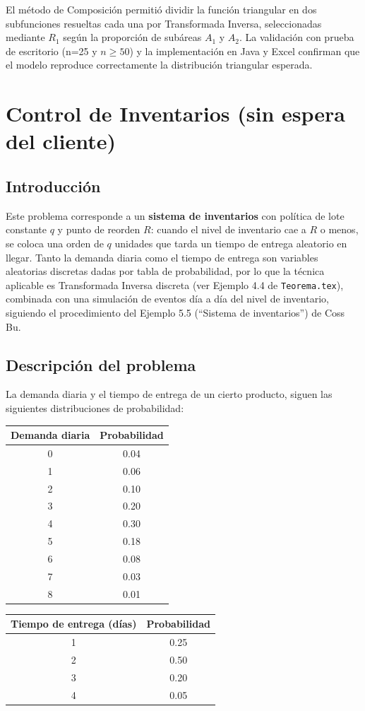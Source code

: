 \documentclass[12pt, a4paper]{article}
\begin{document}
El método de Composición permitió dividir la función triangular en dos subfunciones resueltas cada una por Transformada Inversa, seleccionadas mediante $R_1$ según la proporción de subáreas $A_1$ y $A_2$. La validación con prueba de escritorio (n=25 y $n \geq 50$) y la implementación en Java y Excel confirman que el modelo reproduce correctamente la distribución triangular esperada.


\newpage

\section{Control de Inventarios (sin espera del cliente)}

\subsection{Introducción}

Este problema corresponde a un \textbf{sistema de inventarios} con política de lote constante $q$ y punto de reorden $R$: cuando el nivel de inventario cae a $R$ o menos, se coloca una orden de $q$ unidades que tarda un tiempo de entrega aleatorio en llegar. Tanto la demanda diaria como el tiempo de entrega son variables aleatorias discretas dadas por tabla de probabilidad, por lo que la técnica aplicable es Transformada Inversa discreta (ver Ejemplo 4.4 de \texttt{Teorema.tex}), combinada con una simulación de eventos día a día del nivel de inventario, siguiendo el procedimiento del Ejemplo 5.5 (``Sistema de inventarios'') de Coss Bu.

\subsection{Descripción del problema}

La demanda diaria y el tiempo de entrega de un cierto producto, siguen las siguientes distribuciones de probabilidad:

\begin{center}
\begin{tabular}{cc}
\toprule
Demanda diaria & Probabilidad \\
\midrule
0 & 0.04 \\
1 & 0.06 \\
2 & 0.10 \\
3 & 0.20 \\
4 & 0.30 \\
5 & 0.18 \\
6 & 0.08 \\
7 & 0.03 \\
8 & 0.01 \\
\bottomrule
\end{tabular}
\qquad
\begin{tabular}{cc}
\toprule
Tiempo de entrega (días) & Probabilidad \\
\midrule
1 & 0.25 \\
2 & 0.50 \\
3 & 0.20 \\
4 & 0.05 \\
\bottomrule
\end{tabular}
\end{center}
\end{document}
